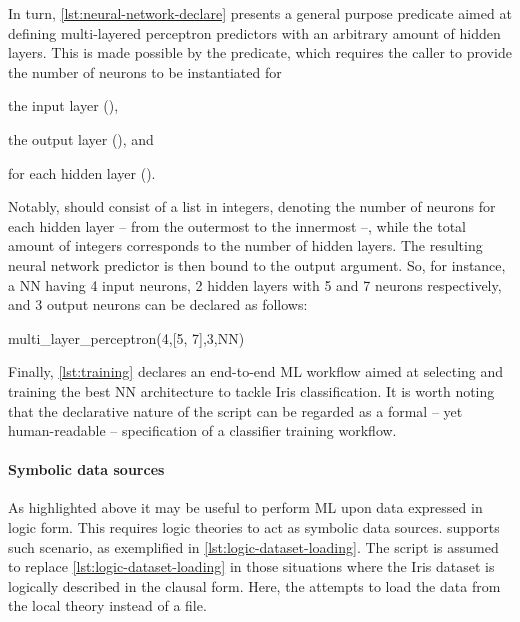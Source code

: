 \documentclass[runningheads]{llncs}
\begin{document}
In turn, \cref{lst:neural-network-declare} presents a general purpose predicate aimed at defining multi-layered perceptron predictors with an arbitrary amount of hidden layers.
%
This is made possible by the  predicate, which requires the caller to provide the number of neurons to be instantiated for
%
\begin{inlinelist}
    \item the input layer (),
    \item the output layer (), and
    \item for each hidden layer ().
\end{inlinelist}
%
Notably,  should consist of a list in integers, denoting the number of neurons for each hidden layer -- from the outermost to the innermost --, while the total amount of integers corresponds to the number of hidden layers.
%
The resulting neural network predictor is then bound to the  output argument.
%
So, for instance, a NN having 4 input neurons, 2 hidden layers with 5 and 7 neurons respectively, and 3 output neurons can be declared as follows:
%
\begin{lp}
    multi\_layer\_perceptron(4,[5, 7],3,NN)
\end{lp}

Finally, \cref{lst:training} declares an end-to-end ML workflow aimed at selecting and training the best NN architecture to tackle Iris classification.
%
It is worth noting that the declarative nature of the script can be regarded as a formal -- yet human-readable -- specification of a classifier training workflow.

\paragraph{Symbolic data sources}

As highlighted above it may be useful to perform ML upon data expressed in logic form.
%
This requires logic theories to act as symbolic data sources.
%
\mllib{} supports such scenario, as exemplified in \cref{lst:logic-dataset-loading}.
%
The script is assumed to replace \cref{lst:logic-dataset-loading} in those situations where the Iris dataset is logically described in the clausal form.
%
Here, the  attempts to load the data from the local theory instead of a file.

\end{document}
